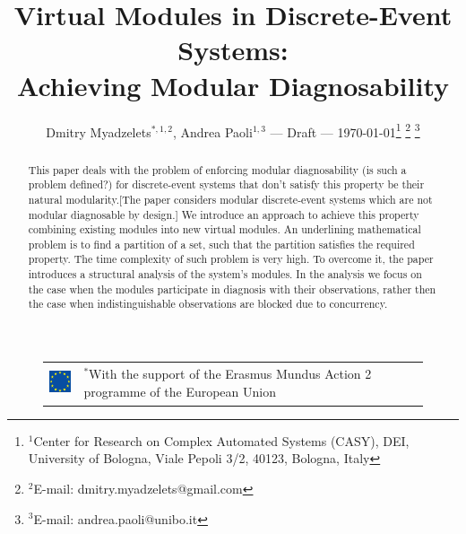 \documentclass[letterpaper, 10pt, conference]{ieeeconf}
\begin{document}
\title{Virtual Modules in Discrete-Event Systems: \\ Achieving Modular
Diagnosability} \author{Dmitry Myadzelets$^{*,1,2}$, Andrea Paoli$^{1,3}$ ---
Draft --- \today \thanks{$^{1}$Center for Research on Complex Automated Systems
(CASY), DEI, University of Bologna, Viale Pepoli 3/2, 40123, Bologna, Italy}
	\thanks{$^{2}$E-mail: {dmitry.myadzelets@gmail.com}}
	\thanks{$^{3}$E-mail: {andrea.paoli@unibo.it}}
} \maketitle

\begin{figure}[!b]
\begin{tabular}{l p{60mm}}
 	\includegraphics[height=10mm]{EU_flag.eps}
 	& \vspace{-10mm} \footnotesize
 	$^{*}$With the support of the Erasmus Mundus Action 2 programme of the
 	European Union
\end{tabular}
\end{figure}

\begin{abstract}
This paper deals with the problem of enforcing modular diagnosability (is such a
problem defined?) for discrete-event systems that don't satisfy this property be
their natural modularity.[The paper considers modular discrete-event systems
which are not modular diagnosable by design.] We introduce an approach to
achieve this property combining existing modules into new virtual modules. An
underlining mathematical problem is to find a partition of a set, such that the
partition satisfies the required property. The time complexity of such problem
is very high.
To overcome it, the paper introduces a structural analysis of the system's
modules. In the analysis we focus on the case when the modules participate in
diagnosis with their observations, rather then the case when indistinguishable
observations are blocked due to concurrency.
\end{abstract}
\end{document}
